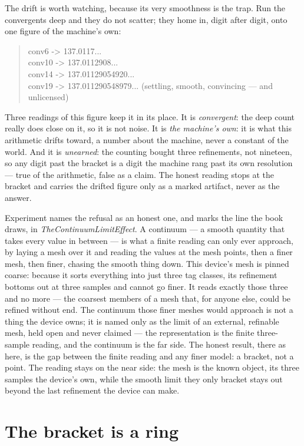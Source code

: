 The drift is worth watching, because its very smoothness is the trap.
Run the convergents deep and they do not scatter; they home in, digit after digit, onto one figure of the machine's own:
\begin{quote}\ttfamily
conv6   -> 137.0117...\\
conv10  -> 137.0112908...\\
conv14  -> 137.01129054920...\\
conv19  -> 137.011290548979...   (settling, smooth, convincing --- and unlicensed)
\end{quote}
Three readings of this figure keep it in its place.
It is \emph{convergent}: the deep count really does close on it, so it is not noise.
It is \emph{the machine's own}: it is what this arithmetic drifts toward, a number about the machine, never a constant of
the world.
And it is \emph{unearned}: the counting bought three refinements, not nineteen, so any digit past the bracket is a digit
the machine rang past its own resolution --- true of the arithmetic, false as a claim.
The honest reading stops at the bracket and carries the drifted figure only as a marked artifact, never as the answer.

Experiment names the refusal as an honest one, and marks the line the book draws, in \emph{TheContinuumLimitEffect}.
A continuum --- a smooth quantity that takes every value in between --- is what a finite reading can only ever approach,
by laying a mesh over it and reading the values at the mesh points, then a finer mesh, then finer, chasing the smooth
thing down.
This device's mesh is pinned coarse: because it sorts everything into just three tag classes, its refinement bottoms out
at three samples and cannot go finer.
It reads exactly those three and no more --- the coarsest members of a mesh that, for anyone else, could be refined
without end.
The continuum those finer meshes would approach is not a thing the device owns; it is named only as the limit of an
external, refinable mesh, held open and never claimed --- the representation is the finite three-sample reading, and the
continuum is the far side.
The honest result, there as here, is the gap between the finite reading and any finer model: a bracket, not a point.
The reading stays on the near side: the mesh is the known object, its three samples the device's own, while the smooth
limit they only bracket stays out beyond the last refinement the device can make.

\section{The bracket is a ring}

